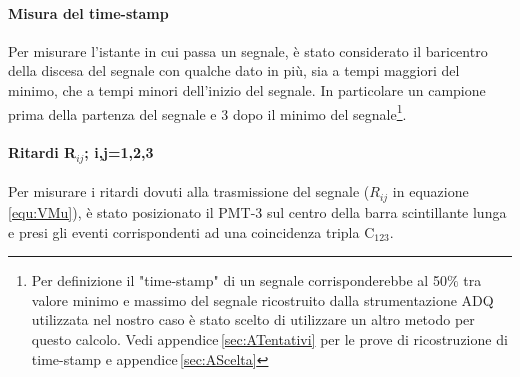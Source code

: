 \documentclass[a4paper,twocolumn]{article}
\begin{document}
\paragraph{Misura del time-stamp}
Per misurare l'istante in cui passa un segnale, è stato considerato il baricentro della discesa del segnale con qualche dato in più, sia a tempi maggiori del minimo, che a tempi minori dell'inizio del segnale. In particolare un campione prima della partenza del segnale e 3 dopo il minimo del segnale\footnote{Per definizione il "time-stamp" di un segnale corrisponderebbe al 50$\%$ tra valore minimo e massimo del segnale ricostruito dalla strumentazione ADQ utilizzata nel nostro caso è stato scelto di utilizzare un altro metodo per questo calcolo. Vedi appendice\,\ref{sec:ATentativi} per le prove di ricostruzione di time-stamp e appendice\,\ref{sec:AScelta}}.

\paragraph{Ritardi R$_{ij}$; i,j=1,2,3}
Per misurare i ritardi dovuti alla trasmissione del segnale ($R_{ij}$ in equazione\,\ref{equ:VMu}), è stato posizionato il PMT-3 sul centro della barra scintillante lunga e presi gli eventi corrispondenti ad una coincidenza tripla C$_{123}$.
\end{document}

